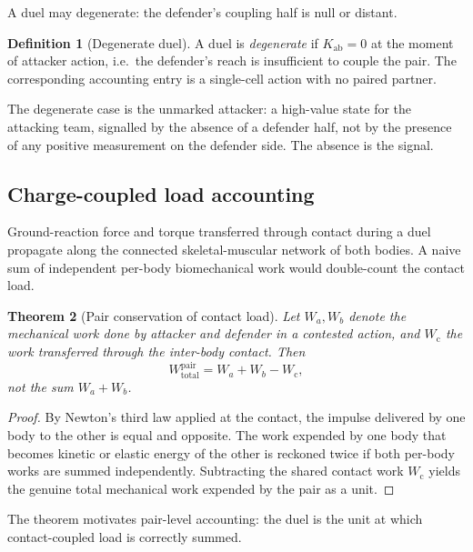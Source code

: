 \documentclass[11pt,twocolumn,a4paper]{article}
\newtheorem{theorem}{Theorem}[section]
\theoremstyle{definition}
\newtheorem{definition}[theorem]{Definition}
\theoremstyle{remark}
\begin{document}
A duel may degenerate: the defender's coupling half is null or distant.

\begin{definition}[Degenerate duel]
\label{def:degen}
A duel is \emph{degenerate} if $K_{\mathrm{ab}} = 0$ at the moment of
attacker action, i.e.\ the defender's reach is insufficient to couple
the pair. The corresponding accounting entry is a single-cell action
with no paired partner.
\end{definition}

The degenerate case is the unmarked attacker: a high-value state for
the attacking team, signalled by the absence of a defender half, not by
the presence of any positive measurement on the defender side. The
absence is the signal.

\subsection{Charge-coupled load accounting}

Ground-reaction force and torque transferred through contact during a
duel propagate along the connected skeletal-muscular network of both
bodies. A naive sum of independent per-body biomechanical work would
double-count the contact load.

\begin{theorem}[Pair conservation of contact load]
\label{thm:loadcons}
Let $W_a, W_b$ denote the mechanical work done by attacker and
defender in a contested action, and $W_{\mathrm{c}}$ the work
transferred through the inter-body contact. Then
\begin{equation}
  W_{\mathrm{total}}^{\mathrm{pair}} = W_a + W_b - W_{\mathrm{c}},
  \label{eq:Wpair}
\end{equation}
not the sum $W_a + W_b$.
\end{theorem}

\begin{proof}
By Newton's third law applied at the contact, the impulse delivered by
one body to the other is equal and opposite. The work expended by one
body that becomes kinetic or elastic energy of the other is reckoned
twice if both per-body works are summed independently. Subtracting the
shared contact work $W_{\mathrm{c}}$ yields the genuine total
mechanical work expended by the pair as a unit.
\end{proof}

The theorem motivates pair-level accounting: the duel is the unit at
which contact-coupled load is correctly summed.
\end{document}
